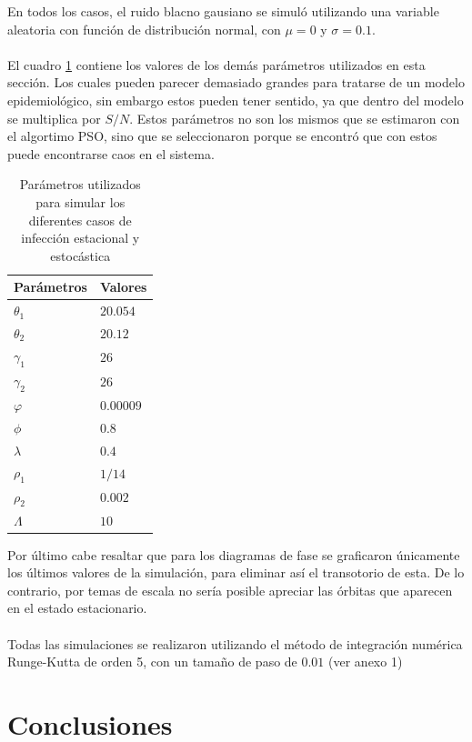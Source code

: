 \documentclass[conference]{IEEEtran}
\begin{document}
En todos los casos, el ruido blacno gausiano se simuló utilizando una variable aleatoria
con función de distribución normal, con $\mu = 0$ y $\sigma = 0.1$.
\\\\
El cuadro \ref{chaos_params} contiene los valores de los demás parámetros utilizados en esta sección. Los cuales pueden
parecer demasiado grandes para tratarse de un modelo epidemiológico, sin embargo estos pueden tener sentido, 
ya que dentro del modelo se multiplica por $S/N$. Estos parámetros no son los mismos que se estimaron con el 
algortimo PSO, sino que se seleccionaron porque se encontró que con estos puede encontrarse caos en el sistema.

\begin{table}[h]
    \centering
    \begin{tabular}{ll}
    \hline
    Parámetros  & Valores    \\ \hline
    $\theta_1 $ & $20.054$    \\ 
    $\theta_2$  & $20.12$ \\ 
    $\gamma_1$  & $26$    \\ 
    $\gamma_2$  & $26$ \\ 
    $\varphi$   & $0.00009$ \\
    $\phi$      & $0.8$  \\
    $\lambda$   & $0.4$ \\
    $\rho_1 $   & $1/14$ \\ 
    $\rho_2$    & $0.002$ \\
    $\Lambda$    & $10$  \\ \hline
    \end{tabular}
    \caption{Parámetros utilizados para simular los diferentes casos de infección 
    estacional y estocástica}
    \label{chaos_params}
\end{table}

Por último cabe resaltar que para los diagramas de fase se graficaron únicamente los últimos valores de la simulación,
para eliminar así el transotorio de esta. De lo contrario, por temas de escala no sería posible apreciar las órbitas
que aparecen en el estado estacionario.
\\\\
Todas las simulaciones se realizaron utilizando el método de integración numérica Runge-Kutta de orden 5,
con un tamaño de paso de $0.01$ (ver anexo 1)



\section{Conclusiones}
\end{document}
